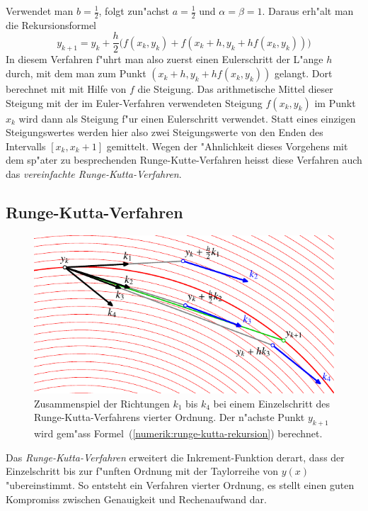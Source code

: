 Verwendet man $b=\frac12$, folgt zun"achst $a=\frac12$ und $\alpha=\beta=1$.
Daraus erh"alt man die Rekursionsformel
\begin{equation}
y_{k+1}=y_k+\frac{h}2\biggl(
f(x_k,y_k) + f(x_k+h, y_k + hf(x_k,y_k))
\biggr)
\label{numerik:simplified-runge-kutta}
\end{equation}
In diesem Verfahren f"uhrt man also zuerst einen Eulerschritt der L"ange
$h$ durch, mit dem man zum Punkt $(x_k+h, y_k+hf(x_k,y_k))$ gelangt.
Dort berechnet mit mit Hilfe von $f$ die Steigung.
Das arithmetische Mittel dieser Steigung mit der im Euler-Verfahren
verwendeten Steigung $f(x_k,y_k)$ im Punkt $x_k$ wird dann als
Steigung f"ur einen Eulerschritt verwendet.
Statt eines einzigen Steigungswertes werden hier also zwei Steigungswerte
von den Enden des Intervalls $[x_k,x_k+1]$ gemittelt.
Wegen der "Ahnlichkeit dieses Vorgehens mit dem sp"ater zu besprechenden
Runge-Kutte-Verfahren heisst diese Verfahren auch das {\em
vereinfachte Runge-Kutta-Verfahren}.

\subsection{Runge-Kutta-Verfahren\label{subsection:numerik:runge-kutta}}
\begin{figure}
\centering
\includegraphics{chapters/images/numerik-4.pdf}
\caption{Zusammenspiel der Richtungen $k_1$ bis $k_4$ bei einem
Einzelschritt des Runge-Kutta-Verfahrens vierter Ordnung.
Der n"achste Punkt $y_{k+1}$ wird gem"ass
Formel~(\ref{numerik:runge-kutta-rekursion}) berechnet.
\label{numerik:rk-step}}
\end{figure}
Das {\em Runge-Kutta-Verfahren} erweitert die Inkrement-Funktion derart,
dass der Einzelschritt bis zur f"unften Ordnung mit der Taylorreihe von
$y(x)$ "ubereinstimmt.
So entsteht ein Verfahren vierter Ordnung, es stellt einen guten Kompromiss
zwischen Genauigkeit und Rechenaufwand dar.

